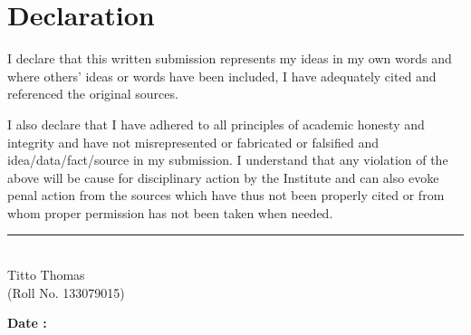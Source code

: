 
\chapter*{Declaration}

\noindent
I declare that this written submission represents my ideas in my own words and where
others' ideas or words have been included, I have adequately cited and referenced the original sources.

\noindent
I also declare that I have adhered to all principles of academic honesty and integrity and have not misrepresented or fabricated or  falsified and idea/data/fact/source in my submission. I understand that any violation of the above will be cause for disciplinary action by the Institute and can also evoke  penal action from the sources which have thus not been 
properly cited or from whom proper permission has not been taken when needed.

\vspace{5cm}
\begin{minipage}[]{.3\textwidth}
\end{minipage}
\hfill
\begin{minipage}[]{.39\textwidth}
	\centering
	\noindent\rule{6cm}{0.4pt}\\
	\vspace{0.2cm}
	Titto Thomas\\\vspace{0.1cm}
	(Roll No. 133079015)\\
\end{minipage}

\vspace{1cm}

\begin{minipage}[]{.3\textwidth}
	\textbf{Date : }\hrulefill\\
\end{minipage}
\hfill
\begin{minipage}[]{.3\textwidth}
\end{minipage}


\thispagestyle{titlepages}